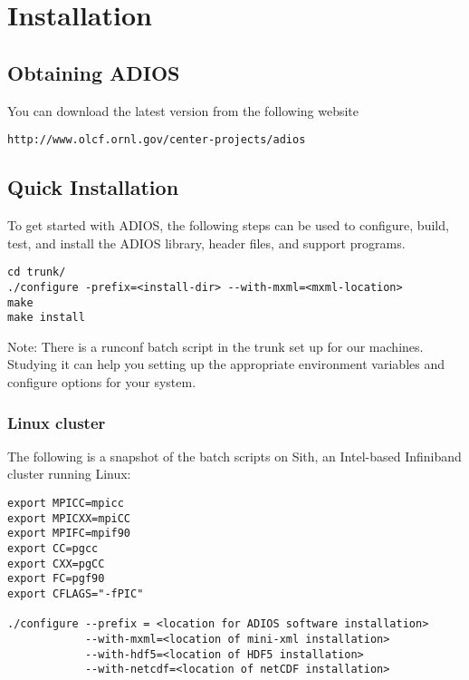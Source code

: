 \chapter{Installation}

\section{Obtaining ADIOS}

You can download the latest version from the following website 

\begin{lstlisting}[language={}]
http://www.olcf.ornl.gov/center-projects/adios
\end{lstlisting}


\section{Quick Installation}

To get started with ADIOS, the following steps can be used to configure, build, 
test, and install the ADIOS library, header files, and support programs. 

\begin{lstlisting}
cd trunk/
./configure -prefix=<install-dir> --with-mxml=<mxml-location>
make
make install
\end{lstlisting}

Note: There is a runconf batch script in the trunk set up for our machines. Studying 
it can help you setting up the appropriate environment variables and configure 
options for your system.

\subsection{Linux cluster}

The following is a snapshot of the batch scripts on Sith, an Intel-based Infiniband 
cluster running Linux:

\begin{lstlisting}
export MPICC=mpicc
export MPICXX=mpiCC
export MPIFC=mpif90
export CC=pgcc
export CXX=pgCC
export FC=pgf90
export CFLAGS="-fPIC"

./configure --prefix = <location for ADIOS software installation>
            --with-mxml=<location of mini-xml installation>
            --with-hdf5=<location of HDF5 installation>
            --with-netcdf=<location of netCDF installation>
\end{lstlisting}


